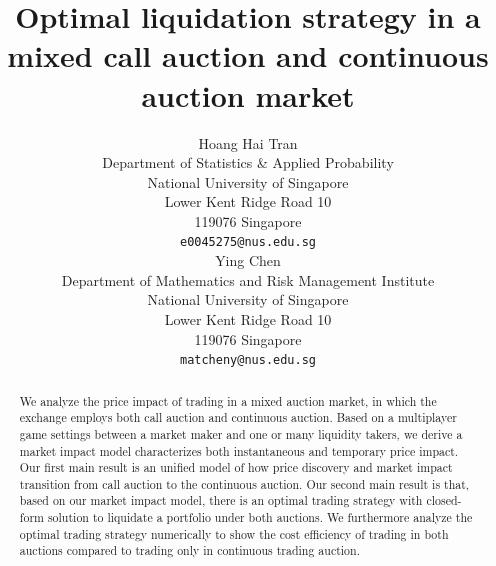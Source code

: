 \documentclass{article}
\title{Optimal liquidation strategy in a mixed call auction and continuous auction market}
\author{
 Hoang Hai Tran\\
 Department of Statistics \& Applied Probability\\
 National University of Singapore \\
 Lower Kent Ridge Road 10 \\
 119076 Singapore \\
 \texttt{e0045275@nus.edu.sg} \\
   \And
 Ying Chen\\
 Department of Mathematics and Risk Management Institute \\
 National University of Singapore \\
 Lower Kent Ridge Road 10 \\
 119076 Singapore \\
 \texttt{matcheny@nus.edu.sg} \\
}
\begin{document}
\maketitle

\begin{abstract}
  We analyze the price impact of trading in a mixed auction market, in which the exchange employs both call auction and continuous auction. Based on a multiplayer game settings between a market maker and one or many liquidity takers, we derive a market impact model characterizes both instantaneous and temporary price impact. Our first main result is an unified model of how price discovery and market impact transition from call auction to the continuous auction. Our second main result is that, based on our market impact model, there is an optimal trading strategy with closed-form solution to liquidate a portfolio under both auctions. We furthermore analyze the optimal trading strategy numerically to show the cost efficiency of trading in both auctions compared to trading only in continuous trading auction.
\end{abstract}
\end{document}
